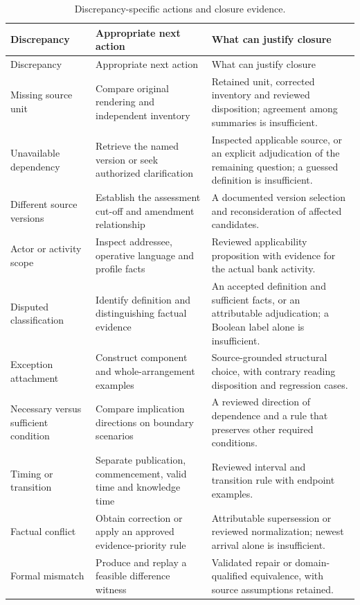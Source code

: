 \documentclass[12pt,a4paper,oneside,openany]{book}
\begin{document}
\begin{longtable}{@{}P{27mm}P{56mm}P{65mm}@{}}
\caption{Discrepancy-specific actions and closure evidence.}\label{tab:resolution-matrix}\\
\toprule
Discrepancy & Appropriate next action & What can justify closure\\\midrule\endfirsthead
\toprule Discrepancy & Appropriate next action & What can justify closure\\\midrule\endhead
Missing source unit & Compare original rendering and independent inventory & Retained unit, corrected inventory and reviewed disposition; agreement among summaries is insufficient.\\
Unavailable dependency & Retrieve the named version or seek authorized clarification & Inspected applicable source, or an explicit adjudication of the remaining question; a guessed definition is insufficient.\\
Different source versions & Establish the assessment cut-off and amendment relationship & A documented version selection and reconsideration of affected candidates.\\
Actor or activity scope & Inspect addressee, operative language and profile facts & Reviewed applicability proposition with evidence for the actual bank activity.\\
Disputed classification & Identify definition and distinguishing factual evidence & An accepted definition and sufficient facts, or an attributable adjudication; a Boolean label alone is insufficient.\\
Exception attachment & Construct component and whole-arrangement examples & Source-grounded structural choice, with contrary reading disposition and regression cases.\\
Necessary versus sufficient condition & Compare implication directions on boundary scenarios & A reviewed direction of dependence and a rule that preserves other required conditions.\\
Timing or transition & Separate publication, commencement, valid time and knowledge time & Reviewed interval and transition rule with endpoint examples.\\
Factual conflict & Obtain correction or apply an approved evidence-priority rule & Attributable supersession or reviewed normalization; newest arrival alone is insufficient.\\
Formal mismatch & Produce and replay a feasible difference witness & Validated repair or domain-qualified equivalence, with source assumptions retained.\\

\end{longtable}
\end{document}

